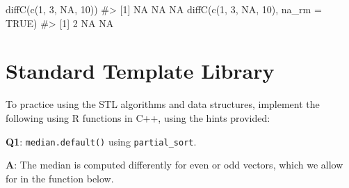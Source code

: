 \documentclass[
]{krantz}
\makeatletter
\newenvironment{Shaded}{\begin{snugshade}}{\end{snugshade}}
\newcommand{\BuiltInTok}[1]{#1}
\newcommand{\CommentTok}[1]{\textcolor[rgb]{0.56,0.35,0.01}{\textit{#1}}}
\newcommand{\ControlFlowTok}[1]{\textcolor[rgb]{0.13,0.29,0.53}{\textbf{#1}}}
\newcommand{\DataTypeTok}[1]{\textcolor[rgb]{0.13,0.29,0.53}{#1}}
\newcommand{\DecValTok}[1]{\textcolor[rgb]{0.00,0.00,0.81}{#1}}
\newcommand{\ImportTok}[1]{#1}
\newcommand{\KeywordTok}[1]{\textcolor[rgb]{0.13,0.29,0.53}{\textbf{#1}}}
\newcommand{\NormalTok}[1]{#1}
\newcommand{\OtherTok}[1]{\textcolor[rgb]{0.56,0.35,0.01}{#1}}
\newcommand{\PreprocessorTok}[1]{\textcolor[rgb]{0.56,0.35,0.01}{\textit{#1}}}
\newenvironment{kframe}{%
\medskip{}
\setlength{\fboxsep}{.8em}
 \def\at@end@of@kframe{}%
 \ifinner\ifhmode%
  \def\at@end@of@kframe{\end{minipage}}%
  \begin{minipage}{\columnwidth}%
 \fi\fi%
 \def\FrameCommand##1{\hskip\@totalleftmargin \hskip-\fboxsep
 \colorbox{shadecolor}{##1}\hskip-\fboxsep
     \hskip-\linewidth \hskip-\@totalleftmargin \hskip\columnwidth}%
 \MakeFramed {\advance\hsize-\width
   \@totalleftmargin\z@ \linewidth\hsize
   \@setminipage}}%
 {\par\unskip\endMakeFramed%
 \at@end@of@kframe}
\renewenvironment{Shaded}{\begin{kframe}}{\end{kframe}}
\renewcommand{\KeywordTok} [1]{\textcolor[rgb]{0.00,0.44,0.13}{{#1}}}
\renewcommand{\DataTypeTok}[1]{\textcolor[rgb]{0.56,0.13,0.00}{{#1}}}
\renewcommand{\DecValTok}  [1]{\textcolor[rgb]{0.25,0.63,0.44}{{#1}}}
\renewcommand{\CommentTok} [1]{\textcolor[rgb]{0.38,0.63,0.69}{{#1}}}
\renewcommand{\OtherTok}   [1]{\textcolor[rgb]{0.00,0.44,0.13}{{#1}}}
\renewcommand{\NormalTok}  [1]{{#1}}
\makeatother
\begin{document}
\begin{Shaded}
\begin{Highlighting}[]
\KeywordTok{diffC}\NormalTok{(}\KeywordTok{c}\NormalTok{(}\DecValTok{1}\NormalTok{, }\DecValTok{3}\NormalTok{, }\OtherTok{NA}\NormalTok{, }\DecValTok{10}\NormalTok{))}
\CommentTok{#> [1] NA NA NA}
\KeywordTok{diffC}\NormalTok{(}\KeywordTok{c}\NormalTok{(}\DecValTok{1}\NormalTok{, }\DecValTok{3}\NormalTok{, }\OtherTok{NA}\NormalTok{, }\DecValTok{10}\NormalTok{), }\DataTypeTok{na_rm =} \OtherTok{TRUE}\NormalTok{)}
\CommentTok{#> [1] 2 NA NA}
\end{Highlighting}
\end{Shaded}

\hypertarget{standard-template-library}{%
\section{Standard Template Library}\label{standard-template-library}}

To practice using the STL algorithms and data structures, implement the following using R functions in C++, using the hints provided:

\textbf{{Q1}}: \texttt{median.default()} using \texttt{partial\_sort}.

\textbf{{A}}: The median is computed differently for even or odd vectors, which we allow for in the function below.

\begin{Shaded}
\end{Shaded}
\end{document}
